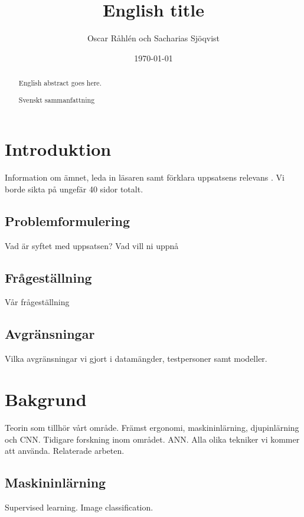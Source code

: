 \documentclass{kththesis}
\title{English title}
\author{Oscar Råhlén och Sacharias Sjöqvist}
\date{\today}
\begin{document}
\frontmatter

\titlepage

\begin{abstract}
  English abstract goes here.
\end{abstract}

\begin{otherlanguage}{swedish}
  \begin{abstract}
    Svenskt sammanfattning
  \end{abstract}
\end{otherlanguage}

\tableofcontents

\mainmatter


\chapter{Introduktion}
Information om ämnet, leda in läsaren samt förklara uppsatsens relevans \parencite{heisenberg2015}. 
Vi borde sikta på ungefär 40 sidor totalt.

  \section{Problemformulering}
  Vad är syftet med uppsatsen? Vad vill ni uppnå

  \section{Frågeställning}
  Vår frågeställning

  \section{Avgränsningar}
  Vilka avgränsningar vi gjort i datamängder, testpersoner samt modeller.

\chapter{Bakgrund}
Teorin som tillhör vårt område. Främst ergonomi, maskininlärning, djupinlärning och CNN. Tidigare forskning inom området. ANN. 
Alla olika tekniker vi kommer att använda. Relaterade arbeten. 

  \section{Maskininlärning}
  Supervised learning. Image classification.
\end{document}
